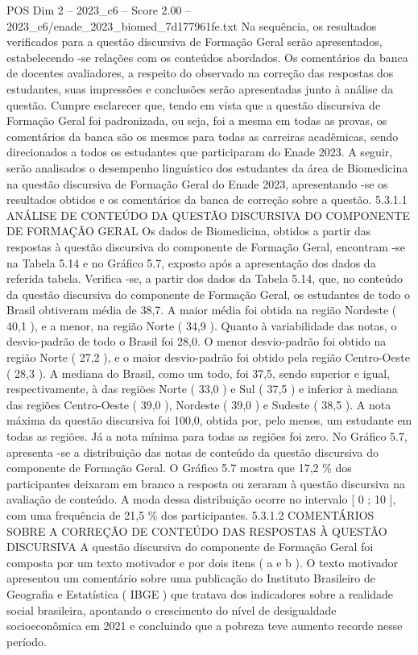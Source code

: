 \begin{textsample}{POS Dim 2 – 2023\_c6 – Score 2.00 – 2023\_c6/enade\_2023\_biomed\_7d177961fe.txt}
Na sequência, os resultados verificados para a questão discursiva de Formação Geral serão apresentados, estabelecendo -se relações com os conteúdos abordados.
Os comentários da banca de docentes avaliadores, a respeito do observado na correção das respostas dos estudantes, suas impressões e conclusões serão apresentadas junto à análise da questão.
Cumpre esclarecer que, tendo em vista que a questão discursiva de Formação Geral foi padronizada, ou seja, foi a mesma em todas as provas, os comentários da banca são os mesmos para todas as carreiras acadêmicas, sendo direcionados a todos os estudantes que participaram do Enade 2023.
A seguir, serão analisados o desempenho linguístico dos estudantes da área de Biomedicina na questão discursiva de Formação Geral do Enade 2023, apresentando -se os resultados obtidos e os comentários da banca de correção sobre a questão. 5.3.1.1 ANÁLISE DE CONTEÚDO DA QUESTÃO DISCURSIVA DO COMPONENTE DE FORMAÇÃO GERAL Os dados de Biomedicina, obtidos a partir das respostas à questão discursiva do componente de Formação Geral, encontram -se na Tabela 5.14 e no Gráfico 5.7, exposto após a apresentação dos dados da referida tabela.
Verifica -se, a partir dos dados da Tabela 5.14, que, no conteúdo da questão discursiva do componente de Formação Geral, os estudantes de todo o Brasil obtiveram média de 38,7.
A maior média foi obtida na região Nordeste ( 40,1 ), e a menor, na região Norte ( 34,9 ).
Quanto à variabilidade das notas, o desvio-padrão de todo o Brasil foi 28,0.
O menor desvio-padrão foi obtido na região Norte ( 27,2 ), e o maior desvio-padrão foi obtido pela região Centro-Oeste ( 28,3 ).
A mediana do Brasil, como um todo, foi 37,5, sendo superior e igual, respectivamente, à das regiões Norte ( 33,0 ) e Sul ( 37,5 ) e inferior à mediana das regiões Centro-Oeste ( 39,0 ), Nordeste ( 39,0 ) e Sudeste ( 38,5 ).
A nota máxima da questão discursiva foi 100,0, obtida por, pelo menos, um estudante em todas as regiões.
Já a nota mínima para todas as regiões foi zero.
No Gráfico 5.7, apresenta -se a distribuição das notas de conteúdo da questão discursiva do componente de Formação Geral.
O Gráfico 5.7 mostra que 17,2 \% dos participantes deixaram em branco a resposta ou zeraram à questão discursiva na avaliação de conteúdo.
A moda dessa distribuição ocorre no intervalo [ 0 ; 10 ], com uma frequência de 21,5 \% dos participantes. 5.3.1.2 COMENTÁRIOS SOBRE A CORREÇÃO DE CONTEÚDO DAS RESPOSTAS À QUESTÃO DISCURSIVA A questão discursiva do componente de Formação Geral foi composta por um texto motivador e por dois itens ( a e b ).
O texto motivador apresentou um comentário sobre uma publicação do Instituto Brasileiro de Geografia e Estatística ( IBGE ) que tratava dos indicadores sobre a realidade social brasileira, apontando o crescimento do nível de desigualdade socioeconômica em 2021 e concluindo que a pobreza teve aumento recorde nesse período.

\end{textsample}
